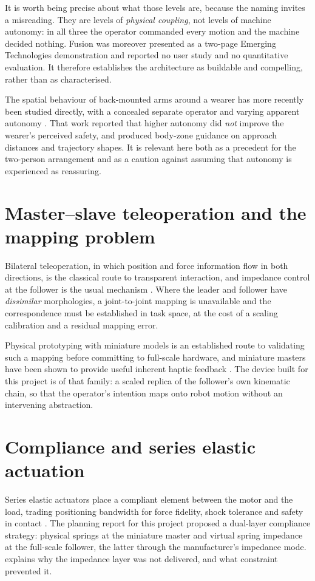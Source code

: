 It is worth being precise about what those levels are, because the naming
invites a misreading. They are levels of \emph{physical coupling}, not levels
of machine autonomy: in all three the operator commanded every motion and the
machine decided nothing. Fusion was moreover presented as a two-page Emerging
Technologies demonstration and reported no user study and no quantitative
evaluation. It therefore establishes the architecture as buildable and
compelling, rather than as characterised.

The spatial behaviour of back-mounted arms around a wearer has more recently
been studied directly, with a concealed separate operator and varying apparent
autonomy \cite{zhou2026proxemics}. That work reported that higher autonomy did
\emph{not} improve the wearer's perceived safety, and produced body-zone
guidance on approach distances and trajectory shapes. It is relevant here both
as a precedent for the two-person arrangement and as a caution against
assuming that autonomy is experienced as reassuring.

\section{Master--slave teleoperation and the mapping problem}

Bilateral teleoperation, in which position and force information flow in both
directions, is the classical route to transparent interaction, and impedance
control at the follower is the usual mechanism \cite{dewolde2024impedance}.
Where the leader and follower have \emph{dissimilar} morphologies, a
joint-to-joint mapping is unavailable and the correspondence must be
established in task space, at the cost of a scaling calibration and a residual
mapping error.

Physical prototyping with miniature models is an established route to
validating such a mapping before committing to full-scale hardware, and
miniature masters have been shown to provide useful inherent haptic feedback
\cite{guggenheim2021haptic}. The device built for this project is of that
family: a scaled replica of the follower's own kinematic chain, so that the
operator's intention maps onto robot motion without an intervening
abstraction.

\section{Compliance and series elastic actuation}

Series elastic actuators place a compliant element between the motor and the
load, trading positioning bandwidth for force fidelity, shock tolerance and
safety in contact \cite{toubar2022sea, lee2019sea}. The planning report for
this project proposed a dual-layer compliance strategy: physical springs at
the miniature master and virtual spring impedance at the full-scale follower,
the latter through the manufacturer's impedance mode. 
explains why the impedance layer was not delivered, and what constraint
prevented it.

